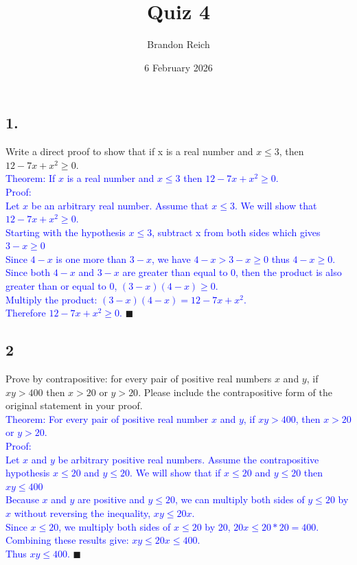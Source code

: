 \documentclass{article}
\title{Quiz 4}
\author{Brandon Reich}
\date{6 February 2026}
\begin{document}
\maketitle

\subsection*{1.}
Write a direct proof to show that if x is a real number and $x \le 3$, then $12 - 7x + x^2 \ge 0$. \\[1em]
\textcolor{blue}{Theorem: If $x$ is a real number and $x \le 3$ then $12 - 7x + x^2 \ge 0$.} \\[1em]
\textcolor{blue}{Proof:} \\
\textcolor{blue}{Let $x$ be an arbitrary real number. Assume that $x \le 3$. We will show that $12 - 7x + x^2 \ge 0$.} \\
\textcolor{blue}{Starting with the hypothesis $x \le 3$, subtract x from both sides which gives $3 - x \ge 0$} \\
\textcolor{blue}{Since $4 - x$ is one more than $3 - x$, we have $4 - x > 3 - x \ge 0$ thus $4 - x \ge 0$.} \\
\textcolor{blue}{Since both $4 - x$ and $3 - x$ are greater than equal to 0, then the product is also greater than or equal to 0, $(3 - x)(4 - x) \ge 0$.} \\
\textcolor{blue}{Multiply the product: $(3 - x)(4 - x) = 12 - 7x + x^2$.} \\
\textcolor{blue}{Therefore $12 - 7x + x^2 \ge 0.$} $\blacksquare$

\subsection*{2}
Prove by contrapositive:  for every pair of positive real numbers $x$ and $y$, if $xy > 400$ then $x > 20$ or $y > 20$. Please include the contrapositive form of the original statement in your proof. \\[1em]
\textcolor{blue}{Theorem: For every pair of positive real number $x$ and $y$, if $xy > 400$, then $x > 20$ or $y > 20$.} \\[1em]
\textcolor{blue}{Proof:} \\
\textcolor{blue}{Let $x$ and $y$ be arbitrary positive real numbers. Assume the contrapositive hypothesis $x \le 20$ and $y \le 20$. We will show that if $x \le 20$ and $y \le 20$ then $xy \le 400$} \\
\textcolor{blue}{Because $x$ and $y$ are positive and $y \le 20$, we can multiply both sides of $y \le 20$ by $x$ without reversing the inequality, $xy \le 20x$.} \\
\textcolor{blue}{Since $x \le 20$, we multiply both sides of $x \le 20$ by 20, $20x \le 20 * 20 = 400$.} \\
\textcolor{blue}{Combining these results give: $xy \le 20x \le 400$.} \\
\textcolor{blue}{Thus $xy \le 400$.} $\blacksquare$
\end{document}
